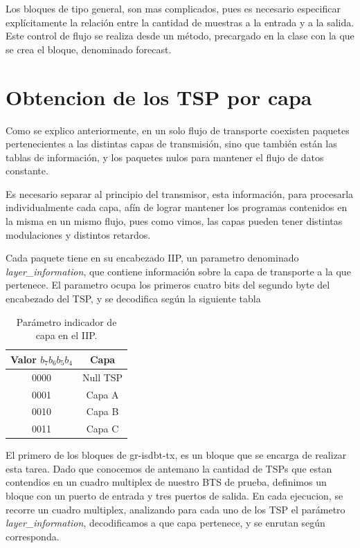 Los bloques de tipo general, son mas complicados, pues es necesario especificar explícitamente la relación entre la cantidad de muestras a la entrada y a la salida. Este control de flujo se realiza desde un método, precargado en la clase con la que se crea el bloque, denominado forecast.

\section{Obtencion de los TSP por capa}

Como se explico anteriormente, en un solo flujo de transporte coexisten paquetes pertenecientes a las distintas capas de transmisión, sino que también están las tablas de información, y los paquetes nulos para mantener el flujo de datos constante. 

Es necesario separar al principio del transmisor, esta información, para procesarla individualmente cada capa, afín de lograr mantener los programas contenidos en la misma en un mismo flujo, pues como vimos, las capas pueden tener distintas modulaciones y distintos retardos. 

Cada paquete tiene en su encabezado IIP, un parametro denominado \textit{layer\_information}, que contiene información sobre la capa de transporte a la que pertenece. El parametro ocupa los primeros cuatro bits del segundo byte del encabezado del TSP, y se decodifica según la siguiente tabla

\begin{table}[h!]
	\centering
	\begin{tabular}{|c|c|}
		\hline
		\textbf{Valor $b_{7}b_{6}b_{5}b_{4}$} & \textbf{Capa}\\
		\hline
		0000 		& Null TSP\\
		\hline
		0001 		& Capa A\\
		\hline
		0010 		& Capa B\\
		\hline
		0011 		& Capa C\\
		\hline
	\end{tabular}
	\caption{\label{Identificador de capa para TSP} Par\'ametro indicador de capa en el IIP.}
\end{table}

El primero de los bloques de gr-isdbt-tx, es un bloque que se encarga de realizar esta tarea. Dado que conocemos de antemano la cantidad de TSPs que estan contendios en un cuadro multiplex de nuestro BTS de prueba, definimos un bloque con un puerto de entrada y tres puertos de salida. En cada ejecucion, se recorre un cuadro multiplex, analizando para cada uno de los TSP el parámetro \textit{layer\_information}, decodificamos a que capa pertenece, y se enrutan según corresponda. 

